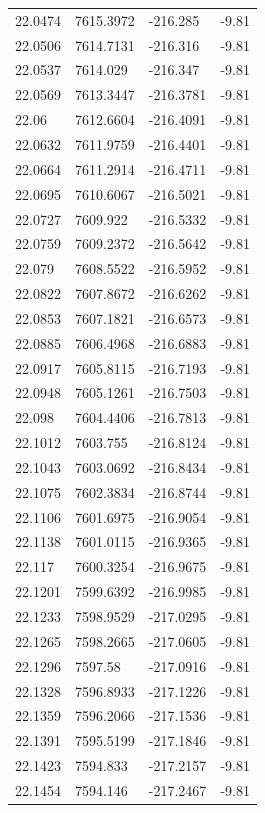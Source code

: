 \begin{table}[H]
\begin{tabular}{llll}
22.0474 & 7615.3972 & -216.285 & -9.81 \\
22.0506 & 7614.7131 & -216.316 & -9.81 \\
22.0537 & 7614.029 & -216.347 & -9.81 \\
22.0569 & 7613.3447 & -216.3781 & -9.81 \\
22.06 & 7612.6604 & -216.4091 & -9.81 \\
22.0632 & 7611.9759 & -216.4401 & -9.81 \\
22.0664 & 7611.2914 & -216.4711 & -9.81 \\
22.0695 & 7610.6067 & -216.5021 & -9.81 \\
22.0727 & 7609.922 & -216.5332 & -9.81 \\
22.0759 & 7609.2372 & -216.5642 & -9.81 \\
22.079 & 7608.5522 & -216.5952 & -9.81 \\
22.0822 & 7607.8672 & -216.6262 & -9.81 \\
22.0853 & 7607.1821 & -216.6573 & -9.81 \\
22.0885 & 7606.4968 & -216.6883 & -9.81 \\
22.0917 & 7605.8115 & -216.7193 & -9.81 \\
22.0948 & 7605.1261 & -216.7503 & -9.81 \\
22.098 & 7604.4406 & -216.7813 & -9.81 \\
22.1012 & 7603.755 & -216.8124 & -9.81 \\
22.1043 & 7603.0692 & -216.8434 & -9.81 \\
22.1075 & 7602.3834 & -216.8744 & -9.81 \\
22.1106 & 7601.6975 & -216.9054 & -9.81 \\
22.1138 & 7601.0115 & -216.9365 & -9.81 \\
22.117 & 7600.3254 & -216.9675 & -9.81 \\
22.1201 & 7599.6392 & -216.9985 & -9.81 \\
22.1233 & 7598.9529 & -217.0295 & -9.81 \\
22.1265 & 7598.2665 & -217.0605 & -9.81 \\
22.1296 & 7597.58 & -217.0916 & -9.81 \\
22.1328 & 7596.8933 & -217.1226 & -9.81 \\
22.1359 & 7596.2066 & -217.1536 & -9.81 \\
22.1391 & 7595.5199 & -217.1846 & -9.81 \\
22.1423 & 7594.833 & -217.2157 & -9.81 \\
22.1454 & 7594.146 & -217.2467 & -9.81 \\

\end{tabular}
\end{table}
